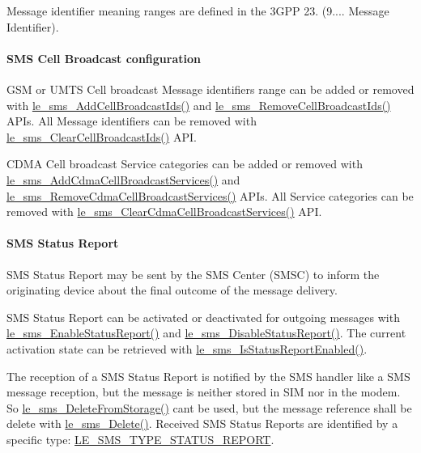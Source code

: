 Message identifier meaning ranges are defined in the 3\+G\+PP 23. (9.... Message Identifier).\hypertarget{c_sms_le_sms_ops_broadcast_configuration}{}\paragraph{S\+M\+S Cell Broadcast configuration}\label{c_sms_le_sms_ops_broadcast_configuration}
G\+SM or U\+M\+TS Cell broadcast Message identifiers range can be added or removed with \hyperlink{le__sms__interface_8h_aae87dacecc438ea9182d370895e5cb3f}{le\+\_\+sms\+\_\+\+Add\+Cell\+Broadcast\+Ids()} and \hyperlink{le__sms__interface_8h_a656fefe815bb965e10087ee65b59faa0}{le\+\_\+sms\+\_\+\+Remove\+Cell\+Broadcast\+Ids()} A\+P\+Is. All Message identifiers can be removed with \hyperlink{le__sms__interface_8h_ae3333cbf700035067f2dae8ea0e564d0}{le\+\_\+sms\+\_\+\+Clear\+Cell\+Broadcast\+Ids()} A\+PI.

C\+D\+MA Cell broadcast Service categories can be added or removed with \hyperlink{le__sms__interface_8h_ad57196114a634f36b057a9cfbcb7d58a}{le\+\_\+sms\+\_\+\+Add\+Cdma\+Cell\+Broadcast\+Services()} and \hyperlink{le__sms__interface_8h_ae7c58d4ed9ff586d2403232b0cda99e7}{le\+\_\+sms\+\_\+\+Remove\+Cdma\+Cell\+Broadcast\+Services()} A\+P\+Is. All Service categories can be removed with \hyperlink{le__sms__interface_8h_ac737aaab68b6fa1d51a21b518ad112a9}{le\+\_\+sms\+\_\+\+Clear\+Cdma\+Cell\+Broadcast\+Services()} A\+PI.\hypertarget{c_sms_le_sms_ops_statusReport}{}\paragraph{S\+M\+S Status Report}\label{c_sms_le_sms_ops_statusReport}
S\+MS Status Report may be sent by the S\+MS Center (S\+M\+SC) to inform the originating device about the final outcome of the message delivery.

S\+MS Status Report can be activated or deactivated for outgoing messages with \hyperlink{le__sms__interface_8h_abb90bbe4ce17b1b8d029d25a6e6cc2de}{le\+\_\+sms\+\_\+\+Enable\+Status\+Report()} and \hyperlink{le__sms__interface_8h_af9c9679ca63f412c1c2a1165eb293d51}{le\+\_\+sms\+\_\+\+Disable\+Status\+Report()}. The current activation state can be retrieved with \hyperlink{le__sms__interface_8h_a301b97fc1568ad3f2699846bde5f71b4}{le\+\_\+sms\+\_\+\+Is\+Status\+Report\+Enabled()}.

The reception of a S\+MS Status Report is notified by the S\+MS handler like a S\+MS message reception, but the message is neither stored in S\+IM nor in the modem. So \hyperlink{le__sms__interface_8h_aff755186b683b94ba2788b48e28284a3}{le\+\_\+sms\+\_\+\+Delete\+From\+Storage()} can\textquotesingle{}t be used, but the message reference shall be delete with \hyperlink{le__sms__interface_8h_aca1691010c88995cb47225f2889910fa}{le\+\_\+sms\+\_\+\+Delete()}. Received S\+MS Status Reports are identified by a specific type\+: \hyperlink{le__sms__interface_8h_a9001c5bc939bda5d5865e363bdf7662caa2fb7260ae0bba4a3d1635f199b86811}{L\+E\+\_\+\+S\+M\+S\+\_\+\+T\+Y\+P\+E\+\_\+\+S\+T\+A\+T\+U\+S\+\_\+\+R\+E\+P\+O\+RT}.

